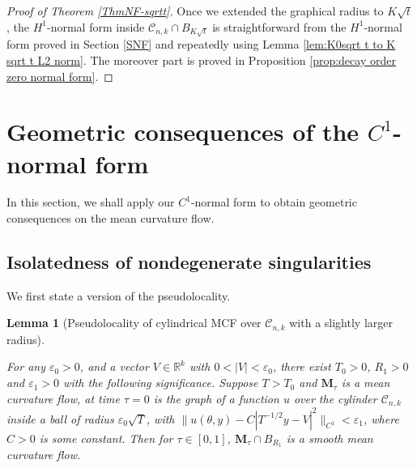 \documentclass[11pt]{amsart}
\numberwithin{equation}{section}
\newtheorem{lemma}[theorem]{Lemma}
\numberwithin{equation}{section}
\newcommand{\eps}{\varepsilon}
\newcommand{\bM}{\mathbf{M}}
\newcommand{\cC}{\mathcal{C}}
\newcommand{\R}{\mathbb{R}}
\begin{document}
	\begin{proof}[Proof of Theorem \ref{ThmNF-sqrtt}]
		Once we extended the graphical radius to $K\sqrt{t}$, the $H^1$-normal form inside $\cC_{n,k}\cap B_{K\sqrt{t}}$ is straightforward from the $H^1$-normal form proved in Section \ref{SNF} and repeatedly using Lemma \ref{lem:K0sqrt t to K sqrt t L2 norm}. The moreover part is proved in Proposition \ref{prop:decay order zero normal form}.
	\end{proof}
	
	
	
	\section{Geometric consequences of the $C^1$-normal form}\label{S_Geometric}
	In this section, we shall apply our $C^1$-normal form to obtain geometric consequences on the mean curvature flow. 
	
	\subsection{Isolatedness of nondegenerate singularities}\label{SIsolate}
	We first state a version of the pseudolocality. 
	
	\begin{lemma}[Pseudolocality of cylindrical MCF over $\cC_{n,k}$ with a slightly larger radius]\label{lem:plcyl}
		
		For any $\eps_0>0$, and a vector $V\in \R^k$ with $0<|V|<\eps_0$, there exist $T_0>0$, $R_1>0$ and $\eps_1>0$ with the following significance. Suppose $T>T_0$ and $\bM_\tau$ is a mean curvature flow, at time $\tau=0$ is the graph of a function $u$ over the cylinder $\cC_{n,k}$ inside a ball of radius $\eps_0\sqrt{T}$, with $\|u(\theta,y)-C|T^{-1/2}y-V|^2\|_{C^1}<\eps_1$, where $C>0$ is some constant. Then for $\tau\in[0,1]$, $\bM_\tau\cap B_{R_1}$ is a smooth mean curvature flow.
	\end{lemma}
	
	
	
\end{document}

